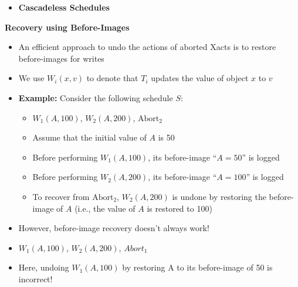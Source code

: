 \documentclass[10pt,landscape]{article}
\newcommand{\1}{\mathmybb{1}}
\begin{document}
\begin{multicols*}{3}
\begin{itemize}
    \item[] \hspace*{-0.7em}\textbf{Cascadeless Schedules}
\end{itemize}

\textbf{Recovery using Before-Images}
\begin{itemize}
    \item An efficient approach to undo the actions of aborted Xacts is to restore before-images for writes
    \item We use $W_i(x,v)$ to denote that $T_i$ updates the value of object $x$ to $v$
    \item \textbf{Example:} Consider the following schedule $S$:
    \begin{itemize}
        \item $W_1(A,100)$, $W_2(A,200)$, $\text{Abort}_2$
        \item Assume that the initial value of $A$ is 50
        \item Before performing $W_1(A,100)$, its before-image ``$A=50$'' is logged
        \item Before performing $W_2(A,200)$, its before-image ``$A=100$'' is logged
        \item To recover from $\text{Abort}_2$, $W_2(A,200)$ is undone by restoring the before-image of $A$ (i.e., the value of $A$ is restored to 100)
    \end{itemize}
    \item However, before-image recovery doesn’t always work!
    \item $W_1(A,100)$, $W_2(A,200)$, $Abort_1$
    \item Here, undoing $W_1(A,100)$ by restoring A to its before-image of 50 is incorrect!
\end{itemize}


\end{multicols*}
\end{document}
